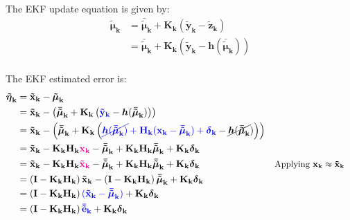 \documentclass[12pt]{article}
\newcommand{\bvec}[1]{\mathbf{#1}} %
\newcommand{\mat}[1]{\mathbf{#1}}
\newcommand{\parentheses}[1]{\left(#1\right)}
\newcommand{\mb}[1]{{\boldsymbol{#1}}} %
\newcommand{\blue}[1]{\color{blue}#1\color{black}}
\newcommand{\magenta}[1]{\color{magenta}#1\color{black}}
\begin{document}
The EKF update equation is given by:
\begin{equation}
\begin{aligned}
    \mb{\tilde\mu}_\mathbf{k} &= \mb{\bar{\tilde\mu}}_\mathbf{k} + \mat{K_k}\parentheses{\bvec{\tilde{y}_k} - \bvec{\tilde{z}_k}}\\
    &= \mb{\bar{\tilde\mu}}_\mathbf{k} + \mat{K_k}\parentheses{\bvec{\tilde{y}_k} - \mb{h}(\mb{\bar{\tilde\mu}}_\mathbf{k})}\\
    \label{eq:ekf-update}
\end{aligned}
\end{equation}

The EKF estimated error is:
\begin{equation}
\begin{aligned}
    \mb{\tilde\eta}_\mathbf{k} &= \bvec{\tilde{x}_k} - \mb{\tilde{\mu}}_\mathbf{k}\\
    &= \bvec{\tilde{x}_k} - \parentheses{\mb{\bar{\tilde\mu}}_\mathbf{k} + \mat{K_k}\parentheses{\blue{\bvec{\tilde{y}_k}}
        - \mb{h}(\mb{\bar{\tilde\mu}}_\mathbf{k})}}\\
    &= \bvec{\tilde{x}_k} - \parentheses{\mb{\bar{\tilde\mu}}_\mathbf{k} 
    + \mat{K_k}\parentheses{\blue{\cancel{\mb{h}(
        \mb{\bar{\tilde\mu}}_\mathbf{k})} + \mat{H_k}(\bvec{x_k} 
        - \mb{\bar{\tilde{\mu}}}_\mathbf{k}) 
        + \mb{\delta}_\mathbf{k}} 
        - \cancel{\mb{h}(\mb{\bar{\tilde\mu}}_\mathbf{k}})}}\\
    &= \bvec{\tilde{x}_k} - \mat{K_k H_k} \magenta{\bvec{x_k}}
    - \mb{\bar{\tilde{\mu}}}_\mathbf{k} + \mat{K_k H_k}
    \mb{\bar{\tilde{\mu}}}_\mathbf{k} + \mat{K_k} \mb{\delta}_\mathbf{k}\\
    &= \bvec{\tilde{x}_k} - \mat{K_k H_k} \magenta{\bvec{\tilde{x}_k}}
    - \mb{\bar{\tilde{\mu}}}_\mathbf{k} + \mat{K_k H_k}
    \mb{\bar{\tilde{\mu}}}_\mathbf{k} + \mat{K_k} \mb{\delta}_\mathbf{k}
    && \small\text{Applying $\bvec{x_k} \approx \bvec{\tilde{x}_k}$}\\
    &= \parentheses{\mat{I - K_k H_k}}\bvec{\tilde{x}_k} 
    -\parentheses{\mat{I - K_k H_k}}\mb{\bar{\tilde{\mu}}}_\mathbf{k}
    + \mat{K_k} \mb{\delta}_\mathbf{k}\\
    &= \parentheses{\mat{I - K_k H_k}} \blue{(\bvec{\tilde{x}_k} 
    - \mb{\bar{\tilde{\mu}}}_\mathbf{k})} 
    + \mat{K_k} \mb{\delta}_\mathbf{k}\\
    &= \parentheses{\mat{I - K_k H_k}} \blue{\bvec{\bar{\tilde{e}}_k}} 
    + \mat{K_k} \mb{\delta}_\mathbf{k}
\end{aligned}
\end{equation}
\end{document}
